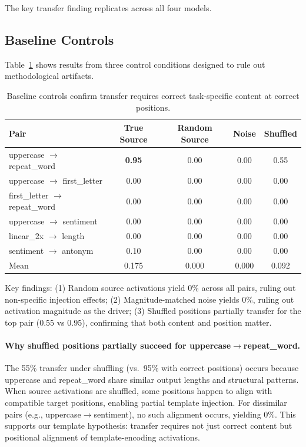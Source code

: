 \documentclass[runningheads]{llncs}
\begin{document}
The key transfer finding replicates across all four models.

\subsection{Baseline Controls}

Table~\ref{tab:baseline_controls} shows results from three control conditions designed to rule out methodological artifacts.

\begin{table}[h]
\centering
\caption{Baseline controls confirm transfer requires correct task-specific content at correct positions.}
\label{tab:baseline_controls}
\begin{tabular}{@{}lcccc@{}}
\toprule
Pair & True Source & Random Source & Noise & Shuffled \\
\midrule
uppercase $\to$ repeat\_word & \textbf{0.95} & 0.00 & 0.00 & 0.55 \\
uppercase $\to$ first\_letter & 0.00 & 0.00 & 0.00 & 0.00 \\
first\_letter $\to$ repeat\_word & 0.00 & 0.00 & 0.00 & 0.00 \\
uppercase $\to$ sentiment & 0.00 & 0.00 & 0.00 & 0.00 \\
linear\_2x $\to$ length & 0.00 & 0.00 & 0.00 & 0.00 \\
sentiment $\to$ antonym & 0.10 & 0.00 & 0.00 & 0.00 \\
\midrule
Mean & 0.175 & 0.000 & 0.000 & 0.092 \\
\bottomrule
\end{tabular}
\end{table}

Key findings: (1) Random source activations yield 0\% across all pairs, ruling out non-specific injection effects; (2) Magnitude-matched noise yields 0\%, ruling out activation magnitude as the driver; (3) Shuffled positions partially transfer for the top pair (0.55 vs 0.95), confirming that both content and position matter.

\paragraph{Why shuffled positions partially succeed for uppercase$\to$repeat\_word.} The 55\% transfer under shuffling (vs.\ 95\% with correct positions) occurs because uppercase and repeat\_word share similar output lengths and structural patterns. When source activations are shuffled, some positions happen to align with compatible target positions, enabling partial template injection. For dissimilar pairs (e.g., uppercase$\to$sentiment), no such alignment occurs, yielding 0\%. This supports our template hypothesis: transfer requires not just correct content but positional alignment of template-encoding activations.
\end{document}
